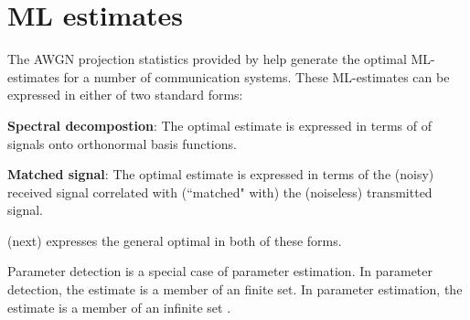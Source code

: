 \section{ML estimates}
\label{sec:awgn_est}
The AWGN projection statistics provided by
 help generate the optimal
ML-estimates for a number of communication systems.
These ML-estimates can be expressed in either of two standard forms:
\begin{liste}
  \item {\bf Spectral decompostion}:
     The optimal estimate is expressed in terms of 
     of signals onto orthonormal basis functions.
  \item {\bf Matched signal}:
     The optimal estimate is expressed in terms of the (noisy)
     received signal correlated with (``matched" with)
     the (noiseless) transmitted signal.
\end{liste}
 (next) expresses the general
optimal  in both of these forms.

Parameter detection is a special case of parameter estimation.
In parameter detection, the estimate is a member of an finite set.
In parameter estimation, the estimate is a member of an infinite set
.

